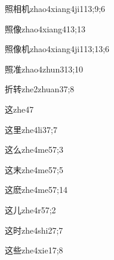 \begin{verbete}{照相机}{zhao4xiang4ji1}{13;9;6}
\end{verbete}

\begin{verbete}{照像}{zhao4xiang4}{13;13}
\end{verbete}

\begin{verbete}{照像机}{zhao4xiang4ji1}{13;13;6}
\end{verbete}

\begin{verbete}{照准}{zhao4zhun3}{13;10}
\end{verbete}

\begin{verbete}{折转}{zhe2zhuan3}{7;8}
\end{verbete}

\begin{verbete}{这}{zhe4}{7}
\end{verbete}

\begin{verbete}{这里}{zhe4li3}{7;7}
\end{verbete}

\begin{verbete}{这么}{zhe4me5}{7;3}
\end{verbete}

\begin{verbete}{这末}{zhe4me5}{7;5}
\end{verbete}

\begin{verbete}{这麽}{zhe4me5}{7;14}
\end{verbete}

\begin{verbete}{这儿}{zhe4r5}{7;2}
\end{verbete}

\begin{verbete}{这时}{zhe4shi2}{7;7}
\end{verbete}

\begin{verbete}{这些}{zhe4xie1}{7;8}
\end{verbete}

